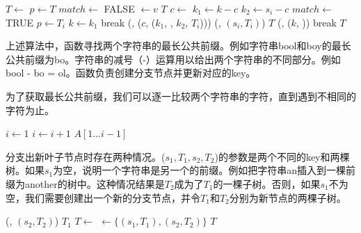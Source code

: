 \documentclass[b5paper]{ctexart}
\begin{document}
\begin{algorithmic}[1]
   \State $T \gets$ 
  \EndIf
  \State $p \gets T$
  \Loop
    \State $match \gets$ FALSE
        \State {} $\gets v$ 
        \State \Return $T$
      \EndIf
      \State $c \gets$ 
      \State $k_1 \gets k - c$
      \State $k_2 \gets s_i - c$
        \State $match \gets$ TRUE
         
          \State $p \gets T_i$
          \State $k \gets k_1$
          \State break
        \Else {}
          \State {}(, ($c$, ($k_1$, , $k_2$, $T_i$)))
          \State {}(, $(s_i, T_i)$)
          \State \Return $T$
        \EndIf
      \EndIf
    \EndFor
     
      \State {}(, ($k$, ))
      \State break
    \EndIf
  \EndLoop
  \State \Return $T$
\EndFunction
\end{algorithmic}

上述算法中，函数寻找两个字符串的最长公共前缀。例如字符串bool和boy的最长公共前缀为bo。字符串的减号（-）运算用以给出两个字符串的不同部分。例如bool - bo = ol。函数负责创建分支节点并更新对应的key。

为了获取最长公共前缀，我们可以逐一比较两个字符串的字符，直到遇到不相同的字符为止。

\begin{algorithmic}[1]
  \State $i \gets 1 $
    \State $i \gets i + 1$
  \EndWhile
  \State \Return $A[1...i-1]$
\EndFunction
\end{algorithmic}

分支出新叶子节点时存在两种情况。($s_1, T_1, s_2, T_2$)的参数是两个不同的key和两棵树。如果$s_1$为空，说明一个字符串是另一个的前缀。例如把字符串an插入到一棵前缀为another的树中。这种情况结果是$T_2$成为了$T_1$的一棵子树。否则，如果$s_1$不为空，我们需要创建出一个新的分支节点，并令$T_1$和$T_2$分别为新节点的两棵子树。

\begin{algorithmic}[1]
    \State {}(, $(s_2, T_2)$)
    \State \Return $T_1$
  \EndIf
  \State $T \gets$ 
  \State {} $\gets \{(s_1, T_1), (s_2, T_2)\}$
  \State \Return $T$
\EndFunction
\end{algorithmic}
\end{document}
